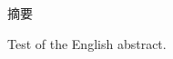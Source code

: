 
\begin{cabstract}
	\pkuthssffaq %
	摘要
\end{cabstract}

\begin{eabstract}
	Test of the English abstract.
\end{eabstract}

